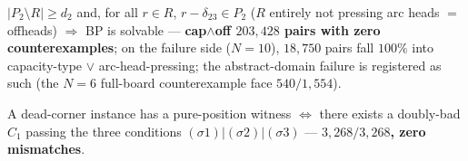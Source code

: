 \begin{corollary}\label{cor:a1941p}
$\lvert P_2\setminus R\rvert\ge d_2$ and, for all $r\in R$,
$r-\delta_{23}\in P_2$ ($R$ entirely not pressing arc heads $=$
offheads) $\Rightarrow$ BP is solvable --- \textbf{cap$\wedge$off
$203{,}428$ pairs with zero counterexamples}; on the failure side ($N=10$),
$18{,}750$ pairs fall $100\%$ into capacity-type $\vee$ arc-head-pressing;
the abstract-domain failure is registered as such (the $N=6$ full-board
counterexample face $540/1{,}554$).
\end{corollary}

\begin{lemma}\label{lem:a1942}
A dead-corner instance has a pure-position witness $\iff$ there exists a
doubly-bad $C_1$ passing the three conditions $(\sigma1)|(\sigma2)|(\sigma3)$
--- \textbf{$3{,}268/3{,}268$, zero mismatches}.
\end{lemma}

